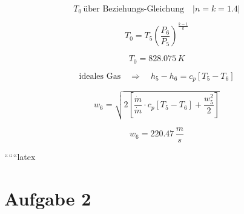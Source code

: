 \begin{equation*}
    T_0 \, \text{über Beziehungs-Gleichung} \quad \left| n = k = 1.4 \right|
\end{equation*}

\begin{equation*}
    T_0 = T_5 \left( \frac{P_6}{P_5} \right)^{\frac{k-1}{k}}
\end{equation*}

\begin{equation*}
    T_0 = 828.075 \, K
\end{equation*}

\begin{equation*}
    \text{ideales Gas} \quad \Rightarrow \quad h_5 - h_6 = c_p \left[ T_5 - T_6 \right]
\end{equation*}

\begin{equation*}
    w_6 = \sqrt{2 \left[ \frac{\dot{m}}{\dot{m}} \cdot c_p \left[ T_5 - T_6 \right] + \frac{w_5^2}{2} \right]}
\end{equation*}

\begin{equation*}
    w_6 = 220.47 \, \frac{m}{s}
\end{equation*}

``````latex


\section*{Aufgabe 2}

